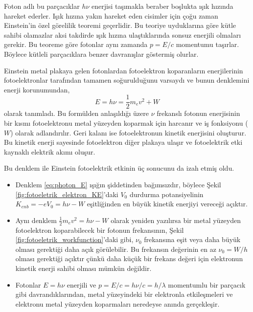 \documentclass[a4paper,12pt, twoside]{article}
\begin{document}
Foton adlı bu parçacıklar $h \nu$ enerjisi taşımakla beraber boşlukta ışık hızında hareket ederler. Işık hızına yakın hareket eden cisimler için çoğu zaman Einstein'in özel görelilik teoremi geçerlidir. Bu teoriye uyduklarına göre kütle sahibi olamazlar aksi takdirde ışık hızına ulaştıklarında sonsuz enerjili olmaları gerekir. Bu teoreme göre fotonlar aynı zamanda $p = E/c$ momentumu taşırlar. Böylece kütleli parçacıklara benzer davranışlar göstermiş olurlar.

Einstein metal plakaya gelen fotonlardan fotoelektron koparanların enerjilerinin fotoelektronlar tarafından tamamen soğurulduğunu varsaydı ve bunun denklemini enerji korunumundan,
\begin{equation}
\label{eq:photon_E}
E = h\nu = \frac{1}{2}m_e v^2 + W
\end{equation}
olarak tanımladı. Bu formülden anlaşıldığı üzere $\nu$ frekanslı fotonun enerjisinin bir kısmı fotoelektronu metal yüzeyden koparmak için harcanır ve iş fonksiyonu ($W$) olarak adlandırılır. Geri kalanı ise fotoelektronun kinetik enerjisini oluşturur. Bu kinetik enerji sayesinde fotoelektron diğer plakaya ulaşır ve fotoelektrik etki kaynaklı elektrik akımı oluşur.

Bu denklem ile Einstein fotoelektrik etkinin üç sonucunu da izah etmiş oldu.

\begin{itemize}
\item Denklem \ref{eq:photon_E} ışığın şiddetinden bağımsızdır, böylece Şekil \ref{fig:fotoeletrik_elektron_KE}'daki $V_0$ durdurma potansiyelinin $K_{enb}=-eV_0=h\nu - W$ eşitliğinden en büyük kinetik enerjiyi vereceği açıktır.

\item Aynı denklem $\frac{1}{2}m_e v^2 = h\nu - W$ olarak yeniden yazılırsa bir metal yüzeyden fotoelektron koparabilecek bir fotonun frekansının, Şekil \ref{fig:fotoeletrik_workfunction}'daki gibi, $\nu_0$ frekansına eşit veya daha büyük olması gerektiği daha açık görülebilir. Bu frekansın değerinin en az $\nu_0 = W/h$ olması gerektiği açıktır çünkü
daha küçük bir frekans değeri için elektronun kinetik enerji sahibi olması mümkün değildir.

\item Fotonlar $E=h\nu$ enerjili ve  $p= E/c = h\nu/c = h/\lambda$ momentumlu bir parçacık gibi davrandıklarından, metal yüzeyindeki bir elektronla etkileşmeleri ve elektronu metal yüzeyden koparmaları neredeyse anında gerçekleşir. 
\end{itemize}
\end{document}
